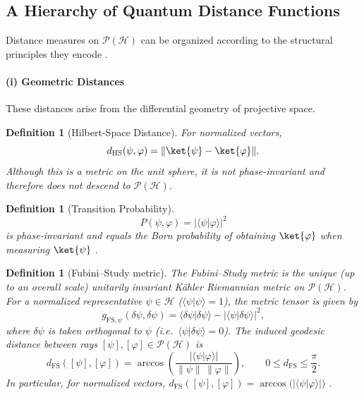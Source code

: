\documentclass[aps,pra,reprint,nofootinbib,showpacs,superscriptaddress]{revtex4-1}
\newtheorem{definition}[theorem]{Definition}
\newcommand{\Proj}{\mathcal{P}}
\begin{document}
\subsection{A Hierarchy of Quantum Distance Functions}

Distance measures on $\Proj(\mathcal{H})$ can be organized
according to the structural principles they encode
\cite{bengtsson2017geometry,nielsen2010quantum}.

\paragraph{(i) Geometric Distances}
These distances arise from the differential geometry of projective space.

\begin{definition}[Hilbert-Space Distance]
For normalized vectors,
\[
d_{\mathrm{HS}}(\psi,\varphi)
=
\|\ket{\psi}-\ket{\varphi}\|.
\]
Although this is a metric on the unit sphere, it is not phase-invariant
and therefore does not descend to $\Proj(\mathcal{H})$.
\end{definition}

\begin{definition}[Transition Probability]
\[
P(\psi,\varphi)=|\langle\psi|\varphi\rangle|^2
\]
is phase-invariant and equals the Born probability of obtaining $\ket{\varphi}$ when measuring $\ket{\psi}$
\cite{peres1997quantum}.
\end{definition}

\begin{definition}[Fubini--Study metric]\label{def:fubini_study}
The \emph{Fubini--Study metric} is the unique (up to an overall scale)
unitarily invariant K\"ahler Riemannian metric on $\mathcal P(\mathcal H)$. For a normalized representative $\psi \in \mathcal H$ 
($\langle \psi|\psi\rangle = 1$), the metric tensor is given by
\[
g_{\mathrm{FS},\psi}(\delta\psi,\delta\psi)
=
\langle \delta\psi | \delta\psi \rangle
-
|\langle \psi | \delta\psi \rangle|^2,
\]
where $\delta\psi$ is taken orthogonal to $\psi$
(i.e.\ $\langle \psi|\delta\psi\rangle = 0$). The induced geodesic distance between rays
$[\psi],[\varphi] \in \mathcal P(\mathcal H)$ is
\[
d_{\mathrm{FS}}([\psi],[\varphi])
=
\arccos\!\left(
\frac{|\langle\psi|\varphi\rangle|}
{\|\psi\|\,\|\varphi\|}
\right),
\qquad
0 \le d_{\mathrm{FS}} \le \frac{\pi}{2}.
\]
In particular, for normalized vectors,
\(
d_{\mathrm{FS}}([\psi],[\varphi])
=
\arccos\big(|\langle\psi|\varphi\rangle|\big)
\) \cite{bengtsson2017geometry}.
\end{definition}
\end{document}
